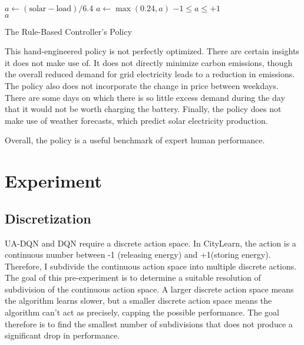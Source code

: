 \begin{algorithm}[h]
    \begin{algorithmic}
        \State $a \gets (\text{solar} - \text{load})/6.4$ 
            \State $a \gets \max(0.24, a)$ 
        \EndIf
        \Ensure $-1 \leq a \leq +1$ \\
        \Return $a$
    \end{algorithmic}
    \caption{The Rule-Based Controller's Policy}
    \label{alg:rbc}
\end{algorithm}

This hand-engineered policy is not perfectly optimized.
There are certain insights it does not make use of.
It does not directly minimize carbon emissions, though the overall reduced demand for grid electricity leads to a reduction in emissions.
The policy also does not incorporate the change in price between weekdays.
There are some days on which there is so little excess demand during the day that it would not be worth charging the battery.
Finally, the policy does not make use of weather forecasts, which predict solar electricity production.

Overall, the policy is a useful benchmark of expert human performance.

\section{Experiment} %

\subsection{Discretization} \label{sec:discretization}
UA-DQN and DQN require a discrete action space.
In CityLearn, the action is a continuous number between -1 (releasing energy) and +1(storing energy).
Therefore, I subdivide the continuous action space into multiple discrete actions.
The goal of this pre-experiment is to determine a suitable resolution of subdivision of the continuous action space.
A larger discrete action space means the algorithm learns slower, but a smaller discrete action space means the algorithm can't act as precisely, capping the possible performance.
The goal therefore is to find the smallest number of subdivisions that does not produce a significant drop in performance.

